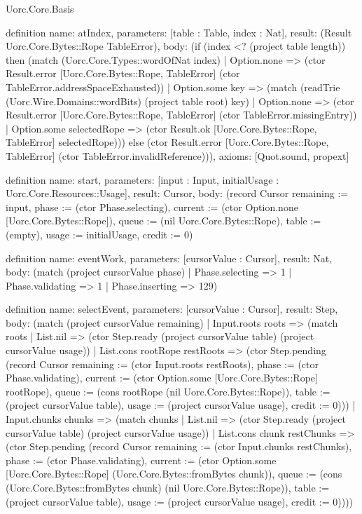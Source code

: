 \begin{lexlean}{Uorc.Core.Basis}
\begin{semanticmodule}
definition{
  name: atIndex,
  parameters: [table : Table, index : Nat],
  result: (Result Uorc.Core.Bytes::Rope TableError),
  body: (if (index <? (project table length)) then (match (Uorc.Core.Types::wordOfNat index)
    | Option.none => (ctor Result.error [Uorc.Core.Bytes::Rope, TableError] (ctor TableError.addressSpaceExhausted))
    | Option.some key => (match (readTrie (Uorc.Wire.Domains::wordBits) (project table root) key)
      | Option.none => (ctor Result.error [Uorc.Core.Bytes::Rope, TableError] (ctor TableError.missingEntry))
      | Option.some selectedRope => (ctor Result.ok [Uorc.Core.Bytes::Rope, TableError] selectedRope))) else (ctor Result.error [Uorc.Core.Bytes::Rope, TableError] (ctor TableError.invalidReference))),
  axioms: [Quot.sound, propext]
}

definition{
  name: start,
  parameters: [input : Input, initialUsage : Uorc.Core.Resources::Usage],
  result: Cursor,
  body: (record Cursor {remaining := input, phase := (ctor Phase.selecting), current := (ctor Option.none [Uorc.Core.Bytes::Rope]), queue := (nil Uorc.Core.Bytes::Rope), table := (empty), usage := initialUsage, credit := 0})
}

definition{
  name: eventWork,
  parameters: [cursorValue : Cursor],
  result: Nat,
  body: (match (project cursorValue phase)
    | Phase.selecting => 1
    | Phase.validating => 1
    | Phase.inserting => 129)
}

definition{
  name: selectEvent,
  parameters: [cursorValue : Cursor],
  result: Step,
  body: (match (project cursorValue remaining)
    | Input.roots roots => (match roots
      | List.nil => (ctor Step.ready (project cursorValue table) (project cursorValue usage))
      | List.cons rootRope restRoots => (ctor Step.pending (record Cursor {remaining := (ctor Input.roots restRoots), phase := (ctor Phase.validating), current := (ctor Option.some [Uorc.Core.Bytes::Rope] rootRope), queue := (cons rootRope (nil Uorc.Core.Bytes::Rope)), table := (project cursorValue table), usage := (project cursorValue usage), credit := 0})))
    | Input.chunks chunks => (match chunks
      | List.nil => (ctor Step.ready (project cursorValue table) (project cursorValue usage))
      | List.cons chunk restChunks => (ctor Step.pending (record Cursor {remaining := (ctor Input.chunks restChunks), phase := (ctor Phase.validating), current := (ctor Option.some [Uorc.Core.Bytes::Rope] (Uorc.Core.Bytes::fromBytes chunk)), queue := (cons (Uorc.Core.Bytes::fromBytes chunk) (nil Uorc.Core.Bytes::Rope)), table := (project cursorValue table), usage := (project cursorValue usage), credit := 0}))))
}


\end{semanticmodule}
\end{lexlean}
